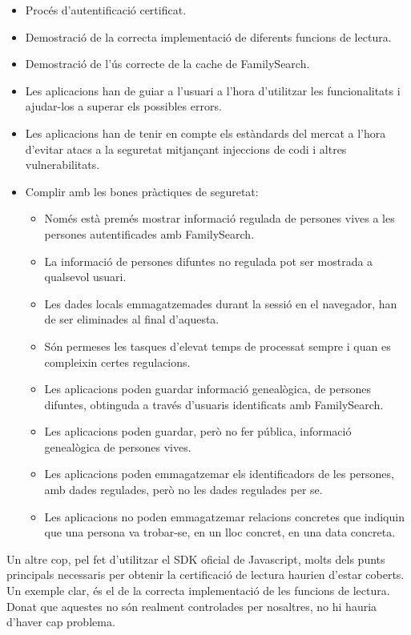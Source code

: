     \begin{itemize}
        \item Procés d'autentificació certificat.
        \item Demostració de la correcta implementació de diferents funcions de lectura.
        \item Demostració de l'ús correcte de la cache de FamilySearch.
        \item Les aplicacions han de guiar a l'usuari a l'hora d'utilitzar les funcionalitats i ajudar-los a superar els possibles errors.
        \item Les aplicacions han de tenir en compte els estàndards del mercat a l'hora d'evitar atacs a la seguretat mitjançant injeccions de codi i altres vulnerabilitats.
        \item Complir amb les bones pràctiques de seguretat:
        \begin{itemize}
            \item Només està premés mostrar informació regulada de persones vives a les persones autentificades amb FamilySearch.
            \item La informació de persones difuntes no regulada pot ser mostrada a qualsevol usuari.
            \item Les dades locals emmagatzemades durant la sessió en el navegador, han de ser eliminades al final d'aquesta.
            \item Són permeses les tasques d'elevat temps de processat sempre i quan es compleixin certes regulacions.
            \item Les aplicacions poden guardar informació genealògica, de persones difuntes, obtinguda a través d'usuaris identificats amb FamilySearch.
            \item Les aplicacions poden guardar, però no fer pública, informació genealògica de persones vives.
            \item Les aplicacions poden emmagatzemar els identificadors de les persones, amb dades regulades, però no les dades regulades per se.
            \item Les aplicacions no poden emmagatzemar relacions concretes que indiquin que una persona va trobar-se, en un lloc concret, en una data concreta.
        \end{itemize}
    \end{itemize}

    Un altre cop, pel fet d'utilitzar el SDK oficial de Javascript, molts dels punts principals necessaris per obtenir la certificació de lectura haurien d'estar coberts. Un exemple clar, és el de la correcta implementació de les funcions de lectura. Donat que aquestes no són realment controlades per nosaltres, no hi hauria d'haver cap problema.

